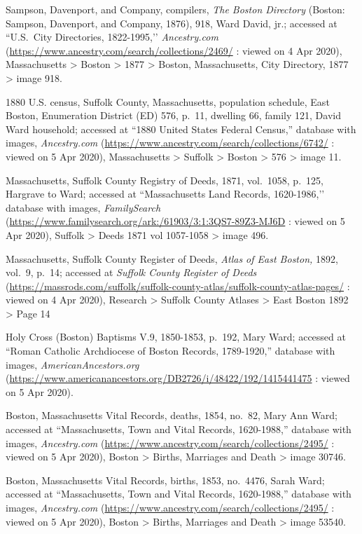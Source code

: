 \begin{thebibliography}{999}
	Sampson, Davenport, and Company, compilers, \textit{The Boston Directory} (Boston: Sampson, Davenport, and Company, 1876), 918, Ward David, jr.; accessed at ``U.S.\ City Directories, 1822-1995,’’ \textit{Ancestry.com} (\url{https://www.ancestry.com/search/collections/2469/} : viewed on 4 Apr 2020), Massachusetts > Boston > 1877 > Boston, Massachusetts, City Directory, 1877 > image 918.
	
	1880 U.S. census, Suffolk County, Massachusetts, population schedule, East Boston, Enumeration District (ED) 576, p.\ 11, dwelling 66, family 121, David Ward household; accessed at ``1880 United States Federal Census,'' database with images, \textit{Ancestry.com} (\url{https://www.ancestry.com/search/collections/6742/} : viewed on 5 Apr 2020), Massachusetts > Suffolk > Boston > 576 > image 11.
	
	Massachusetts, Suffolk County Registry of Deeds, 1871, vol.\ 1058, p.\ 125, Hargrave to Ward; accessed at ``Massachusetts Land Records, 1620-1986,’’ database with images, \textit{FamilySearch} (\url{https://www.familysearch.org/ark:/61903/3:1:3QS7-89Z3-MJ6D} : viewed on 5 Apr 2020), Suffolk > Deeds 1871 vol 1057-1058 > image 496.
	
	Massachusetts, Suffolk County Register of Deeds, \textit{Atlas of East Boston,} 1892, vol.\ 9, p.\ 14; accessed at \textit{Suffolk County Register of Deeds} (\url{https://massrods.com/suffolk/suffolk-county-atlas/suffolk-county-atlas-pages/} : viewed on 4 Apr 2020), Research > Suffolk County Atlases > East Boston 1892 > Page 14
	
	Holy Cross (Boston) Baptisms V.9, 1850-1853, p.\ 192, Mary Ward; accessed at ``Roman Catholic Archdiocese of Boston Records, 1789-1920,'' database with images, \textit{AmericanAncestors.org} (\url{https://www.americanancestors.org/DB2726/i/48422/192/1415441475} : viewed on 5 Apr 2020).	
	
	Boston, Massachusetts Vital Records, deaths, 1854, no.\ 82, Mary Ann Ward; accessed at ``Massachusetts, Town and Vital Records, 1620-1988,'' database with images, \textit{Ancestry.com} (\url{https://www.ancestry.com/search/collections/2495/} : viewed on 5 Apr 2020), Boston > Births, Marriages and Death > image 30746.
	
	Boston, Massachusetts Vital Records, births, 1853, no.\ 4476, Sarah Ward; accessed at ``Massachusetts, Town and Vital Records, 1620-1988,'' database with images, \textit{Ancestry.com} (\url{https://www.ancestry.com/search/collections/2495/} : viewed on 5 Apr 2020), Boston > Births, Marriages and Death > image 53540.
	

\end{thebibliography}
